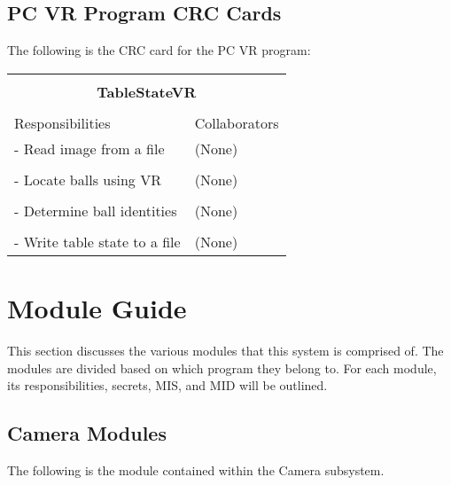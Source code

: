 \documentclass[titlepage]{article}
\begin{document}
\subsection{PC VR Program CRC Cards}
The following is the CRC card for the PC VR program:\\
\begin{table}[!htbp]
\centering
\begin{tabular}{| p{} | p{} |}\hline
	\multicolumn{2}{|l|}{}\\
	\multicolumn{2}{|c|}{\large{\textbf{TableStateVR}}}\\
	\multicolumn{2}{|l|}{}\\\hline
	\vspace{0mm}\large{Responsibilities}\vspace{2mm} &\vspace{0mm}\large{Collaborators}\vspace{2mm}\\\hline
	\vspace{0mm}- Read image from a file		&\vspace{0mm}(None)\\&\\
	- Locate balls using VR						&(None)\\&\\
	- Determine ball identities					&(None)\\&\\
	- Write table state to a file\vspace{2mm}	&(None)\vspace{2mm}\\\hline
\end{tabular}
\end{table}
\newpage



\section{Module Guide}
This section discusses the various modules that this system is comprised of. The modules are divided based on which program they belong to. For each module, its responsibilities, secrets, MIS, and MID will be outlined.
\subsection{Camera Modules}
The following is the module contained within the Camera subsystem.
\end{document}

